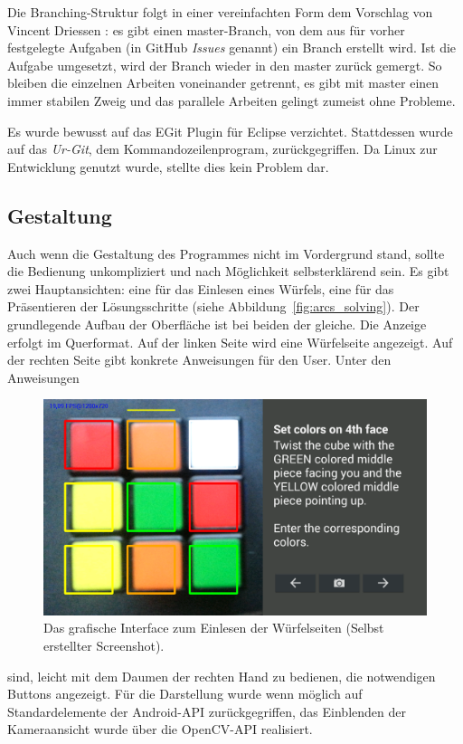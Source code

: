 Die Branching-Struktur folgt in einer vereinfachten Form dem Vorschlag von
Vincent Driessen \citep{git:driessen}: es gibt einen master-Branch, von dem aus
für vorher festgelegte Aufgaben (in GitHub \emph{Issues} genannt) ein Branch
erstellt wird. Ist die Aufgabe umgesetzt, wird der Branch wieder in den master
zurück gemergt. So bleiben die einzelnen Arbeiten voneinander getrennt, es gibt
mit master einen immer stabilen Zweig und das parallele Arbeiten gelingt zumeist
ohne Probleme.

Es wurde bewusst auf das EGit Plugin für Eclipse verzichtet. Stattdessen wurde
auf das \emph{Ur-Git}, dem Kommandozeilenprogram, zurückgegriffen. Da Linux zur
Entwicklung genutzt wurde, stellte dies kein Problem dar.

\subsection{Gestaltung}  %

Auch wenn die Gestaltung des Programmes nicht im Vordergrund stand, sollte die
Bedienung unkompliziert und nach Möglichkeit selbsterklärend sein. Es gibt zwei
Hauptansichten: eine für das Einlesen eines Würfels, eine für das Präsentieren
der Lösungsschritte (siehe Abbildung~\ref{fig:arcs_solving}). Der grundlegende
Aufbau der Oberfläche ist bei beiden der gleiche. Die Anzeige erfolgt im
Querformat. Auf der linken Seite wird eine Würfelseite angezeigt. Auf der
rechten Seite gibt konkrete Anweisungen für den User. Unter den Anweisungen
\begin{figure}[ht!]
  \centering
  \includegraphics[width=\textwidth]{pics/arcs_unsolved}
  \caption{Das grafische Interface zum Einlesen der Würfelseiten
  (Selbst erstellter Screenshot).}
  \label{fig:arcs_unsolved}
\end{figure}
sind, leicht mit dem Daumen der rechten Hand zu bedienen, die notwendigen
Buttons angezeigt. Für die Darstellung wurde wenn möglich auf Standardelemente
der Android-API zurückgegriffen, das Einblenden der Kameraansicht wurde über die
OpenCV-API realisiert.

